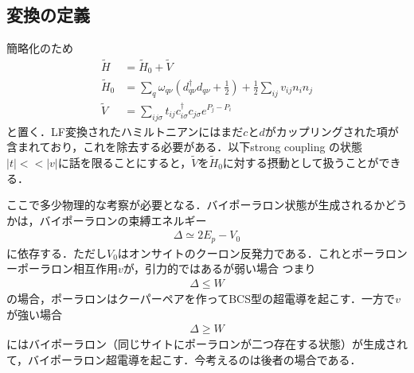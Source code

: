 \documentclass[a4j]{jarticle}
\begin{document}
\subsection{変換の定義}
簡略化のため
\begin{align}
\tilde{H}&=\tilde{H}_0+\tilde{V} \\
 \tilde{H}_0&=\sum_{q}\omega_{q\nu}\left(d^{\dagger}_{q\nu}d_{q\nu}+\frac{1}{2}\right)+\frac{1}{2}\sum_{ij}v_{ij}n_{i}n_{j} \\
 \tilde{V}&=\sum_{ij\sigma}t_{ij}c^{\dagger}_{i\sigma}c_{j\sigma}e^{P_j-P_i} \label{Vtilde}
\end{align}
と置く．LF変換されたハミルトニアンにはまだ$c$と$d$がカップリングされた項が含まれており，これを除去する必要がある．以下strong coupling の状態$|t|<<|v|$に話を限ることにすると，$\tilde{V}$を$\tilde{H}_0$に対する摂動として扱うことができる．

ここで多少物理的な考察が必要となる．バイポーラロン状態が生成されるかどうかは，バイポーラロンの束縛エネルギー
\begin{align}
 \Delta\simeq 2E_p-V_0
\end{align}
に依存する．ただし$V_0$はオンサイトのクーロン反発力である．これとポーラロンーポーラロン相互作用$v$が，引力的ではあるが弱い場合
つまり
\begin{align}
 \Delta \le W
\end{align}
の場合，ポーラロンはクーパーペアを作ってBCS型の超電導を起こす．一方で$v$が強い場合
\begin{align}
 \Delta \ge W
\end{align}
にはバイポーラロン（同じサイトにポーラロンが二つ存在する状態）が生成されて，バイポーラロン超電導を起こす．今考えるのは後者の場合である．
\end{document}
